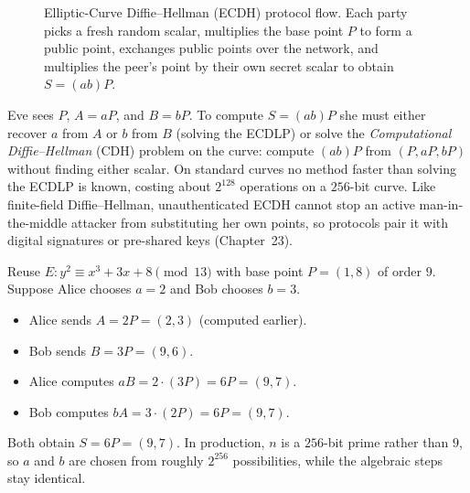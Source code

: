 \begin{figure}[htbp]
\caption{Elliptic-Curve Diffie--Hellman (ECDH) protocol flow. Each party picks a fresh
random scalar, multiplies the base point $P$ to form a public point, exchanges public
points over the network, and multiplies the peer's point by their own secret scalar to
obtain $S = (ab)P$.}
\label{ch21:ecdh-fig}
\end{figure}

\begin{whybox}
Eve sees $P$, $A=aP$, and $B=bP$. To compute $S = (ab)P$ she must either recover $a$ from
$A$ or $b$ from $B$ (solving the ECDLP) or solve the \emph{Computational Diffie--Hellman}
(CDH) problem on the curve: compute $(ab)P$ from $(P, aP, bP)$ without finding either
scalar. On standard curves no method faster than solving the ECDLP is known, costing
about $2^{128}$ operations on a $256$-bit curve. Like finite-field Diffie--Hellman,
unauthenticated ECDH cannot stop an active man-in-the-middle attacker from substituting
her own points, so protocols pair it with digital signatures or pre-shared keys
(Chapter~23).
\end{whybox}

\begin{example}
\label{ch21:ecdh-toy}
Reuse $E: y^2 \equiv x^3+3x+8 \pmod{13}$ with base point $P=(1,8)$ of order $9$. Suppose
Alice chooses $a=2$ and Bob chooses $b=3$.
\begin{itemize}
  \item Alice sends $A = 2P = (2,3)$ (computed earlier).
  \item Bob sends $B = 3P = (9,6)$.
  \item Alice computes $aB = 2\cdot(3P) = 6P = (9,7)$.
  \item Bob computes $bA = 3\cdot(2P) = 6P = (9,7)$.
\end{itemize}
Both obtain $S = 6P = (9,7)$. In production, $n$ is a $256$-bit prime rather than $9$, so
$a$ and $b$ are chosen from roughly $2^{256}$ possibilities, while the algebraic steps
stay identical.
\end{example}

